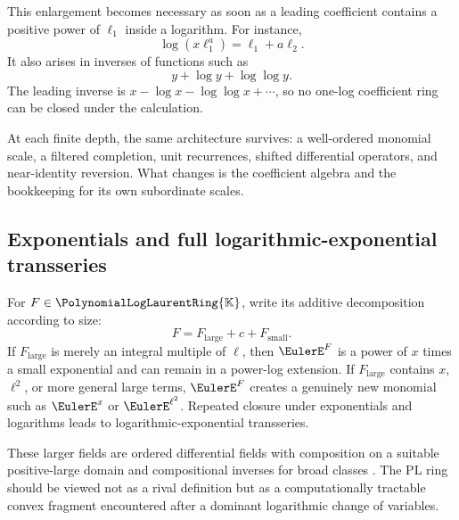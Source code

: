 \documentclass[11pt,oneside]{article}
\numberwithin{equation}{section}
\theoremstyle{definition}
\newcommand{\K}{\mathbb{K}}
\newcommand{\PL}{\PolynomialLogLaurentRing{\K}}
\begin{document}
This enlargement becomes necessary as soon as a leading coefficient contains a
positive power of \(\ell_1\) inside a logarithm.  For instance,
\[
  \log(x\ell_1^a)=\ell_1+a\ell_2.
\]
It also arises in inverses of functions such as
\[
  y+\log y+\log\log y.
\]
The leading inverse is
\(x-\log x-\log\log x+\cdots\), so no one-log coefficient ring can be closed
under the calculation.

At each finite depth, the same architecture survives: a well-ordered monomial
scale, a filtered completion, unit recurrences, shifted differential operators,
and near-identity reversion.  What changes is the coefficient algebra and the
bookkeeping for its own subordinate scales.

\subsection{Exponentials and full logarithmic-exponential transseries}

For \(F\in\PL\), write its additive decomposition according to size:
\[
  F=F_{\mathrm{large}}+c+F_{\mathrm{small}}.
\]
If \(F_{\mathrm{large}}\) is merely an integral multiple of \(\ell\), then
\(\EulerE^F\) is a power of \(x\) times a small exponential and can remain in a
power-log extension.  If \(F_{\mathrm{large}}\) contains \(x\), \(\ell^2\), or
more general large terms, \(\EulerE^F\) creates a genuinely new monomial such as
\(\EulerE^x\) or \(\EulerE^{\ell^2}\).  Repeated closure under exponentials and logarithms
leads to logarithmic-exponential transseries.

These larger fields are ordered differential fields with composition on a
suitable positive-large domain and compositional inverses for broad classes
\cite{EdgarBeginners,EdgarComposition,VanDerHoeven2006}.  The PL ring should be
viewed not as a rival definition but as a computationally tractable convex
fragment encountered after a dominant logarithmic change of variables.
\end{document}
